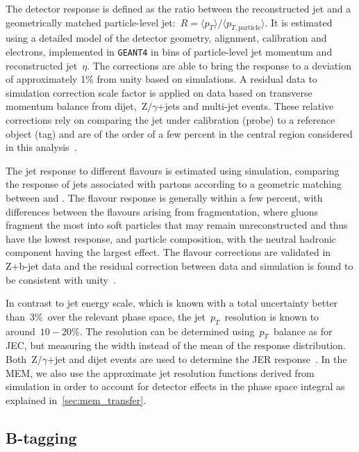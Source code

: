 The detector response is defined as the ratio between the reconstructed jet and a geometrically matched particle-level jet:~$R = \langle p_T \rangle / \langle p_{T,\mathrm{particle}} \rangle$. It is estimated using a detailed model of the detector geometry, alignment, calibration and electrons, implemented in \texttt{GEANT4} in bins of particle-level jet momentum and reconstructed jet~$\eta$. The corrections are able to bring the response to a deviation of approximately 1\% from unity based on simulations. A residual data to simulation correction scale factor is applied on data based on transverse momentum balance from dijet,~$\mathrm{Z}/\gamma$+jets and multi-jet events. These relative corrections rely on comparing the jet under calibration (probe) to a reference object (tag) and are of the order of a few percent in the central region considered in this analysis~\cite{Chatrchyan:2011ds,cms_jec_2017}.

The jet response to different flavours is estimated using simulation, comparing the response of jets associated with partons according to a geometric matching between \pythia and \herwig. The flavour response is generally within a few percent, with differences between the flavours arising from fragmentation, where gluons fragment the most into soft particles that may remain unreconstructed and thus have the lowest response, and particle composition, with the neutral hadronic component having the largest effect. The flavour corrections are validated in Z+b-jet data and the residual correction between data and simulation is found to be consistent with unity~\cite{Chatrchyan:2011ds}.

In contrast to jet energy scale, which is known with a total uncertainty better than~$3\%$~over the relevant phase space, the jet~$p_T$~resolution is known to around~$10-20\%$. The resolution can be determined using~$p_T$~balance as for JEC, but measuring the width instead of the mean of the response distribution. Both~$\mathrm{Z}/\gamma$+jet and dijet events are used to determine the JER response~\cite{Chatrchyan:2011ds}. In the MEM, we also use the approximate jet resolution functions derived from simulation in order to account for detector effects in the phase space integral as explained in~\cref{sec:mem_transfer}.

\subsection{B-tagging}
\label{sec:object_id_btag}

